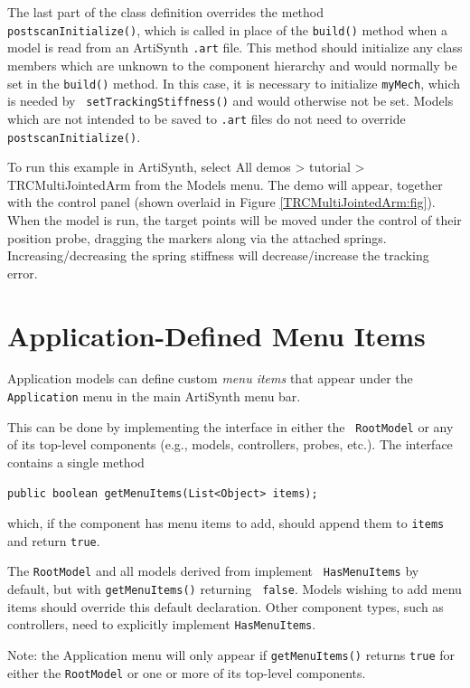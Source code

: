 The last part of the class definition overrides the method {\tt
postscanInitialize()}, which is called in place of the {\tt build()} method
when a model is read from an ArtiSynth {\tt .art} file. This method should
initialize any class members which are unknown to the component hierarchy and
would normally be set in the {\tt build()} method.  In this case, it is
necessary to initialize {\tt myMech}, which is needed by {\tt
setTrackingStiffness()} and would otherwise not be set.  Models which are not
intended to be saved to {\tt .art} files do not need to override {\tt
postscanInitialize()}.

To run this example in ArtiSynth, select {\sf All demos > tutorial >
TRCMultiJointedArm} from the {\sf Models} menu. The demo will appear, together
with the control panel (shown overlaid in Figure
\ref{TRCMultiJointedArm:fig}). When the model is run, the target points will be
moved under the control of their position probe, dragging the markers along via
the attached springs. Increasing/decreasing the spring stiffness will
decrease/increase the tracking error.

\section{Application-Defined Menu Items}
\label{MenuItems:sec}

Application models can define custom {\it menu items} that appear
under the {\tt Application} menu in the main ArtiSynth menu bar.

This can be done by implementing the interface
 in either the {\tt
RootModel} or any of its top-level components (e.g., models,
controllers, probes, etc.). The interface contains a single
method
\begin{lstlisting}[]
   public boolean getMenuItems(List<Object> items);
\end{lstlisting}
%
which, if the component has menu items to add, should append them
to {\tt items} and return {\tt true}.

The {\tt RootModel} and all models derived from
 implement {\tt
HasMenuItems} by default, but with {\tt getMenuItems()} returning {\tt
false}. Models wishing to add menu items should override this default
declaration. Other component types, such as controllers, need to
explicitly implement {\tt HasMenuItems}.

\begin{sideblock}
Note: the {\sf Application} menu will only appear if {\tt getMenuItems()} returns
{\tt true} for either the {\tt RootModel} or one or more of its
top-level components.
\end{sideblock}

